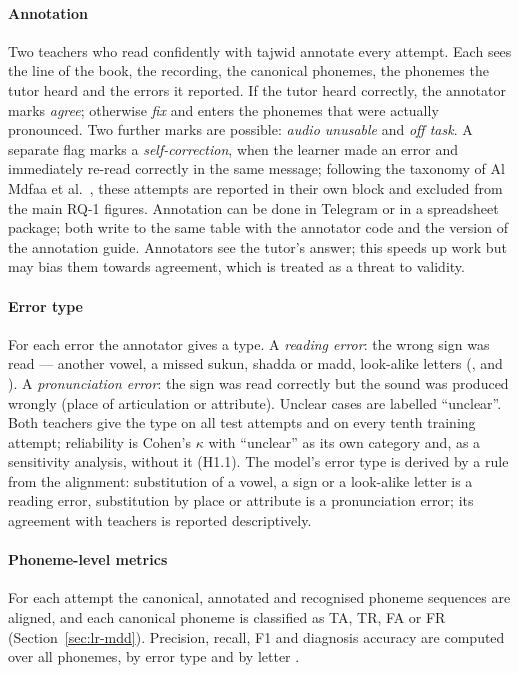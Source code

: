 \paragraph{Annotation} Two teachers who read confidently with tajwid annotate every attempt. Each sees the
line of the book, the recording, the canonical phonemes, the phonemes the tutor heard and the errors it
reported. If the tutor heard correctly, the annotator marks \emph{agree}; otherwise \emph{fix} and enters the
phonemes that were actually pronounced. Two further marks are possible: \emph{audio unusable} and
\emph{off task}. A separate flag marks a \emph{self-correction}, when the learner made an error and immediately
re-read correctly in the same message; following the taxonomy of Al Mdfaa et al.\ \cite{SRC-068}, these
attempts are reported in their own block and excluded from the main RQ-1 figures. Annotation can be done in
Telegram or in a spreadsheet package; both write to the same table with the annotator code and the version
of the annotation guide. Annotators see the tutor's answer; this speeds up work but may bias them towards
agreement, which is treated as a threat to validity.

\paragraph{Error type} For each error the annotator gives a type. A \emph{reading error}: the wrong sign was
read --- another vowel, a missed sukun, shadda or madd, look-alike letters (,  and ). A
\emph{pronunciation error}: the sign was read correctly but the sound was produced wrongly (place of
articulation or attribute). Unclear cases are labelled ``unclear''. Both teachers give the type on all test
attempts and on every tenth training attempt; reliability is Cohen's $\kappa$ with ``unclear'' as its own
category and, as a sensitivity analysis, without it (H1.1). The model's error type is derived by a rule from
the alignment: substitution of a vowel, a sign or a look-alike letter is a reading error, substitution by place
or attribute is a pronunciation error; its agreement with teachers is reported descriptively.

\paragraph{Phoneme-level metrics} For each attempt the canonical, annotated and recognised phoneme sequences
are aligned, and each canonical phoneme is classified as TA, TR, FA or FR (Section~\ref{sec:lr-mdd}).
Precision, recall, F1 and diagnosis accuracy are computed over all phonemes, by error type and by letter
\cite{SRC-064}.

